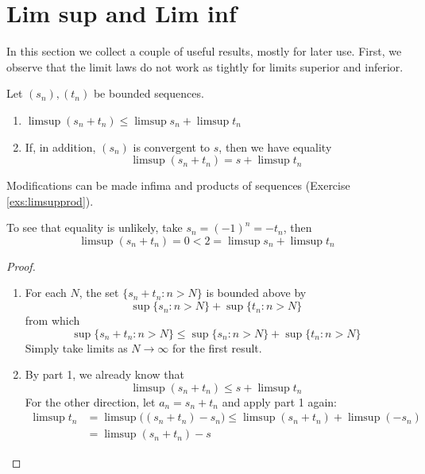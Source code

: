 \clearpage


\section{Lim sup and Lim inf}

In this section we collect a couple of useful results, mostly for later use. First, we observe that the limit laws do not work as tightly for limits superior and inferior.

\begin{thm}{}{}
	Let $(s_n),(t_n)$ be bounded sequences.
	\begin{enumerate}
	  \item $\limsup(s_n+t_n)\le\limsup s_n+\limsup t_n$
	  \item If, in addition, $(s_n)$ is convergent to $s$, then we have equality
	\[\limsup(s_n+t_n)=s+\limsup t_n\]
	\end{enumerate}
\end{thm}

Modifications can be made infima and products of sequences (Exercise \ref{exs:limsupprod}).

\begin{example}{}{}
	To see that equality is unlikely, take $s_n=(-1)^n=-t_n$, then
	\[\limsup(s_n+t_n)=0<2=\limsup s_n+\limsup t_n\]
\end{example}

\begin{proof}
\begin{enumerate}
  \item For each $N$, the set $\{s_n+t_n:n>N\}$ is bounded above by
	\[\sup\{s_n:n>N\}+\sup\{t_n:n>N\}\]
	from which
	\[\sup\{s_n+t_n:n>N\}\le\sup\{s_n:n>N\}+\sup\{t_n:n>N\}\]
	Simply take limits as $N\to\infty$ for the first result.\smallbreak
	
% 	
	
	\item By part 1, we already know that
	\[\limsup(s_n+t_n)\le s+\limsup t_n\]
	For the other direction, let $a_n=s_n+t_n$ and apply part 1 again:
	\begin{align*}
	\limsup t_n&=\limsup \bigl((s_n+t_n)-s_n\bigr)\le \limsup (s_n+t_n)+\limsup(-s_n)\\
	&=\limsup(s_n+t_n)-s\tag*{\qedhere}
	\end{align*}
\end{enumerate}
\end{proof}


